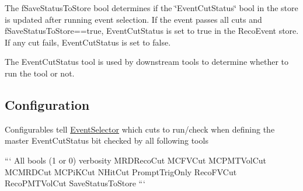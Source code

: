 The f\-Save\-Status\-To\-Store bool determines if the \char`\"{}\-Event\-Cut\-Status\char`\"{} bool in the store is updated after running event selection. If the event passes all cuts and f\-Save\-Status\-To\-Store==true, Event\-Cut\-Status is set to true in the Reco\-Event store. If any cut fails, Event\-Cut\-Status is set to false.

The Event\-Cut\-Status tool is used by downstream tools to determine whether to run the tool or not.

\subsection*{Configuration}

Configurables tell \hyperlink{classEventSelector}{Event\-Selector} which cuts to run/check when defining the master Event\-Cut\-Status bit checked by all following tools

``` All bools (1 or 0) verbosity M\-R\-D\-Reco\-Cut M\-C\-F\-V\-Cut M\-C\-P\-M\-T\-Vol\-Cut M\-C\-M\-R\-D\-Cut M\-C\-Pi\-K\-Cut N\-Hit\-Cut Prompt\-Trig\-Only Reco\-F\-V\-Cut Reco\-P\-M\-T\-Vol\-Cut Save\-Status\-To\-Store ``` 